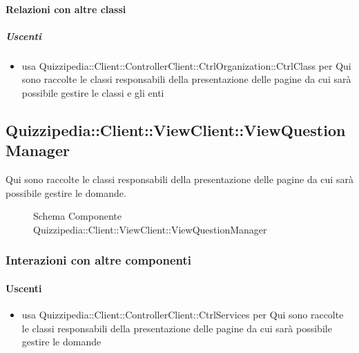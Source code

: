 \paragraph{Relazioni con altre classi}
\subparagraph{Uscenti}
\begin{itemize}
\item usa Quizzipedia::Client::ControllerClient::CtrlOrganization::CtrlClass per Qui sono raccolte le classi responsabili della presentazione delle pagine da cui sarà possibile gestire le classi e gli enti
\end{itemize}
\subsection{Quizzipedia::Client::ViewClient::ViewQuestionManager}
Qui sono raccolte le classi responsabili della presentazione delle pagine da cui sarà possibile gestire le domande.
\begin{figure}[H]
\centering
\noindent{}
\caption[Schema Componente Quizzipedia::Client::ViewClient::ViewQuestionManager]{Schema Componente Quizzipedia::Client::ViewClient::ViewQuestionManager}
\end{figure}
\subsubsection{Interazioni con altre componenti}
\paragraph{Uscenti}
\begin{itemize}
\item usa Quizzipedia::Client::ControllerClient::CtrlServices per Qui sono raccolte le classi responsabili della presentazione delle pagine da cui sarà possibile gestire le domande
\end{itemize}
